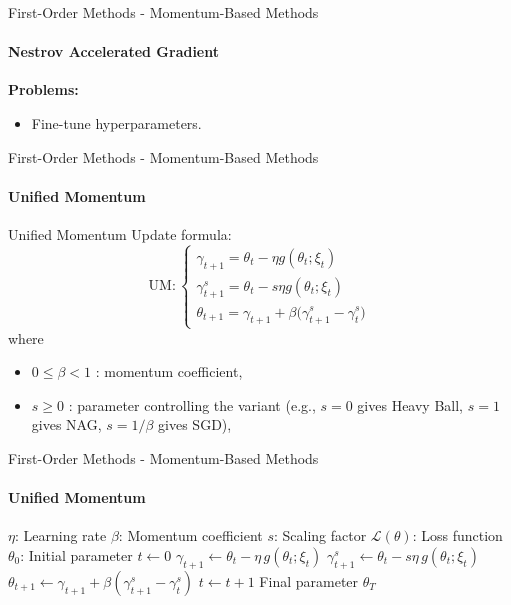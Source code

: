 \documentclass{beamer}
\begin{document}
\begin{frame}[fragile]{First-Order Methods - Momentum-Based Methods}
\framesubtitle{Nestrov Accelerated Gradient}
\textbf{Problems:}
\begin{itemize}
    \item Fine-tune hyperparameters. 
\end{itemize}
\end{frame}

\begin{frame}[fragile]{First-Order Methods - Momentum-Based Methods}
\framesubtitle{Unified Momentum}
\begin{block}{Unified Momentum}
Update formula:
\[
\text{UM}:\begin{cases}
\gamma_{t+1} = \theta_t - \eta g(\theta_t; \xi_t) \\
\gamma^{s}_{t+1} = \theta_t - s \eta g(\theta_t; \xi_t) \\
\theta_{t+1} = \gamma_{t+1} + \beta \big(\gamma^{s}_{t+1} - \gamma^{s}_t)
\end{cases}
\]
where
\begin{itemize}
    \item $0 \le \beta < 1$ : momentum coefficient,
    \item $s \ge 0$ : parameter controlling the variant (e.g., $s=0$ gives Heavy Ball, $s=1$ gives NAG, $s=1/\beta$ gives SGD),
\end{itemize}
\end{block}
\end{frame}

\begin{frame}[fragile]{First-Order Methods - Momentum-Based Methods}
\framesubtitle{Unified Momentum}
\small
\begin{algorithm}[H]
\caption{Unified Momentum (UM)}
\begin{algorithmic}[1]
\Require $\eta$: Learning rate
\Require $\beta$: Momentum coefficient
\Require $s$: Scaling factor
\Require $\mathcal{L}(\theta)$: Loss function
\Require $\theta_0$: Initial parameter
\State $t \gets 0$
    \State $\gamma_{t+1} \gets \theta_t - \eta \, g(\theta_t; \xi_t)$
    \State $\gamma^{s}_{t+1} \gets \theta_t - s \eta \, g(\theta_t; \xi_t)$
    \State $\theta_{t+1} \gets \gamma_{t+1} + \beta (\gamma^{s}_{t+1} - \gamma^{s}_t)$
    \State $t \gets t + 1$
\EndWhile
\State \Return Final parameter $\theta_T$
\end{algorithmic}
\end{algorithm}
\end{frame}
\end{document}
